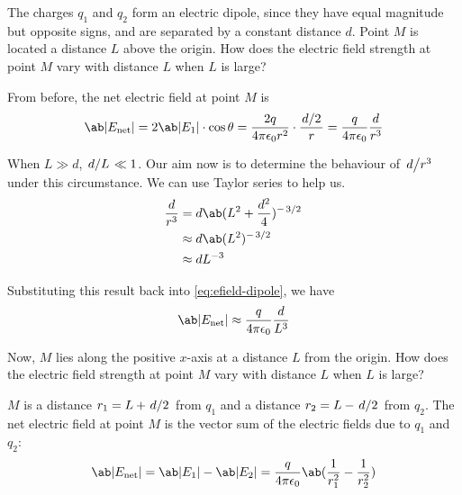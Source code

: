 \begin{problem}
The charges \(q_1\) and \(q_2\) form an electric dipole, since they have equal magnitude but opposite signs,
and are separated by a constant distance \(d\). Point \(M\) is located a distance \(L\) above the origin.
How does the electric field strength at point \(M\) vary with distance \(L\) when \(L\) is large?
\end{problem}
From before, the net electric field at point \(M\) is
\begin{equation}
	\label{eq:efield-dipole}
	\ab|E_\text{net}| = 2\ab|E_1|\cdot\cos\theta = \f{2q}{4\pi\epsilon_0 r^2}\cdot\f{\lf{d}{2}}{r} = \f{q}{4\pi\epsilon_0}\f{d}{r^3}
\end{equation}

When \(L \gg d\), \(\lf{d}{L} \ll 1\).
Our aim now is to determine the behaviour of \(\lf{d}{r^3}\) under this circumstance.
We can use Taylor series to help us.
\begin{align*}
	\f{d}{r^3} & = d\ab(L^2 + \f{d^2}{4})^{-\lf{3}{2}} \\
	           & \approx d\ab(L^2)^{-\lf{3}{2}}        \\
	           & \approx dL^{-3}
\end{align*}

Substituting this result back into \cref{eq:efield-dipole}, we have
\begin{equation*}
	\ab|E_\text{net}| \approx \f{q}{4\pi\epsilon_0}\f{d}{L^3}
\end{equation*}

\begin{problem}
Now, \(M\) lies along the positive \(x\)-axis at a distance \(L\) from the origin.
How does the electric field strength at point \(M\) vary with distance \(L\) when \(L\) is large?
\end{problem}
\(M\) is a distance \(r_1 = L + \lf{d}{2}\) from \(q_1\) and a distance \(r_2 = L - \lf{d}{2}\) from \(q_2\).
The net electric field at point \(M\) is the vector sum of the electric fields due to \(q_1\) and \(q_2\):
\begin{equation}
	\label{eq:efield-dipole-horz}
	\ab|E_\text{net}| = \ab|E_1| - \ab|E_2| = \f{q}{4\pi\epsilon_0}\ab(\f{1}{r_1^2} - \f{1}{r_2^2})
\end{equation}

